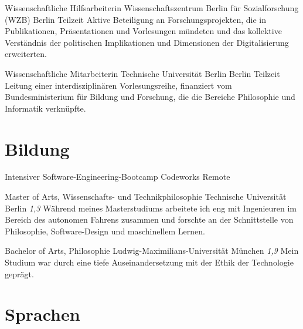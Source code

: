 
  {Wissenschaftliche Hilfsarbeiterin}
  {Wissenschaftszentrum Berlin für Sozialforschung (WZB)}
  {Berlin}
  {Teilzeit}
  {Aktive Beteiligung an Forschungsprojekten, die in Publikationen, Präsentationen und Vorlesungen mündeten und das kollektive Verständnis der politischen Implikationen und Dimensionen der Digitalisierung erweiterten.}

  {Wissenschaftliche Mitarbeiterin}
  {Technische Universität Berlin}
  {Berlin}
  {Teilzeit}
  {Leitung einer interdisziplinären Vorlesungsreihe, finanziert vom Bundesministerium für Bildung und Forschung, die die Bereiche Philosophie und Informatik verknüpfte.}

\section{Bildung}
\cventry{}
  {Intensiver Software-Engineering-Bootcamp}
  {Codeworks}
  {Remote}
  {}
  {}

\cventry{}
  {Master of Arts, Wissenschafts- und Technikphilosophie}
  {Technische Universität}
  {Berlin}
  {\textit{1,3}}
  {Während meines Masterstudiums arbeitete ich eng mit Ingenieuren im Bereich des autonomen Fahrens zusammen und forschte an der Schnittstelle von Philosophie, Software-Design und maschinellem Lernen.}

\cventry{}
  {Bachelor of Arts, Philosophie}
  {Ludwig-Maximilians-Universität}
  {München}
  {\textit{1,9}}
  {Mein Studium war durch eine tiefe Auseinandersetzung mit der Ethik der Technologie geprägt.}

\section{Sprachen}
